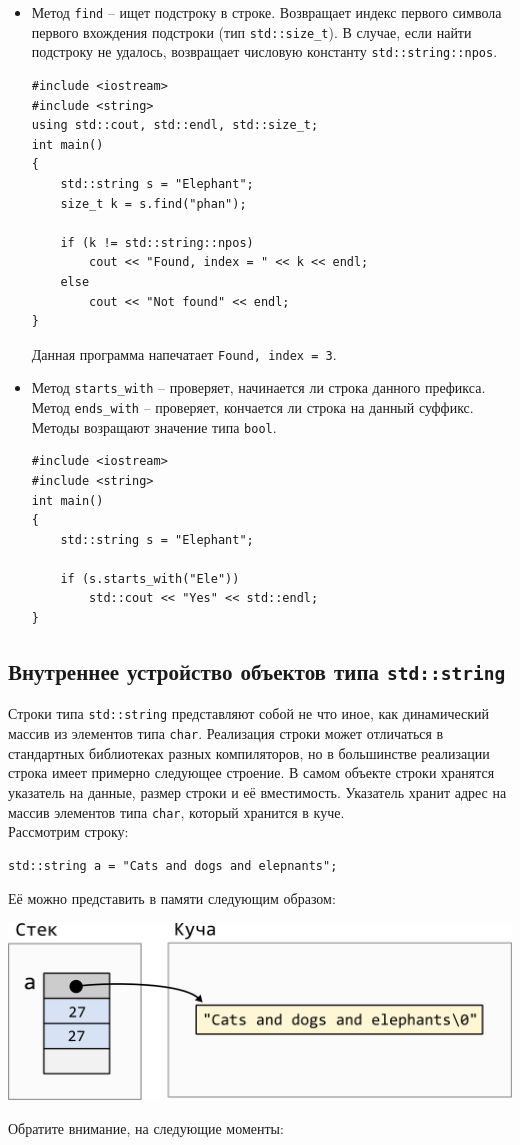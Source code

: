 \documentclass{article}
\begin{document}
\begin{itemize}
\item Метод \texttt{find} -- ищет подстроку в строке. Возвращает индекс первого символа первого вхождения подстроки (тип \texttt{std::size\_t}). В случае, если найти подстроку не удалось, возвращает числовую константу \texttt{std::string::npos}.
\begin{lstlisting}
#include <iostream>
#include <string>
using std::cout, std::endl, std::size_t;
int main()
{
    std::string s = "Elephant";
    size_t k = s.find("phan");
    
    if (k != std::string::npos)
        cout << "Found, index = " << k << endl;
    else
        cout << "Not found" << endl;
}
\end{lstlisting}
Данная программа напечатает \texttt{Found, index = 3}.

\item Метод \texttt{starts\_with} -- проверяет, начинается ли строка данного префикса. Метод \texttt{ends\_with} -- проверяет, кончается ли строка на данный суффикс. Методы возращают значение типа \texttt{bool}.
\begin{lstlisting}
#include <iostream>
#include <string>
int main()
{
    std::string s = "Elephant";
    
    if (s.starts_with("Ele"))
        std::cout << "Yes" << std::endl;
}
\end{lstlisting}


\end{itemize}

\subsection*{Внутреннее устройство объектов типа \texttt{std::string}}

Строки типа \texttt{std::string} представляют собой не что иное, как динамический массив из элементов типа \texttt{char}. Реализация строки может отличаться в стандартных библиотеках разных компиляторов, но в большинстве реализации строка имеет примерно следующее строение. В самом объекте строки хранятся указатель на данные, размер строки и её вместимость. Указатель хранит адрес на массив элементов типа \texttt{char}, который хранится в куче.\\
Рассмотрим строку:
\begin{lstlisting}
std::string a = "Cats and dogs and elepnants";
\end{lstlisting}
Её можно представить в памяти следующим образом:
\begin{center}
\includegraphics[scale=1]{../images/large_string.png}
\end{center}
Обратите внимание, на следующие моменты:
\end{document}

